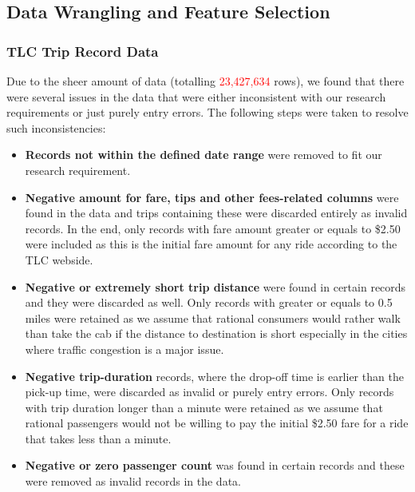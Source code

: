 \documentclass[11pt]{article}
\begin{document}
\subsection{Data Wrangling and Feature Selection}

\subsubsection{TLC Trip Record Data}
Due to the sheer amount of data (totalling \textcolor{red}{23,427,634} rows), we found that there were several issues in the data that were either inconsistent with our research requirements or just purely entry errors. The following steps were taken to resolve such inconsistencies:
\begin{itemize}
\item \textbf{Records not within the defined date range} were removed to fit our research requirement.\vspace{-1mm}

\item \textbf{Negative amount for fare, tips and other fees-related columns} were found in the data and trips containing these were discarded entirely as invalid records. In the end, only records with fare amount greater or equals to \$2.50 were included as this is the initial fare amount for any ride according to the TLC webside.
\vspace{-1mm}

\item \textbf{Negative or extremely short trip distance} were found in certain records and they were discarded as well. Only records with greater or equals to 0.5 miles were retained as we assume that rational consumers would rather walk than take the cab if the distance to destination is short especially in the cities where traffic congestion is a major issue.
\vspace{-1mm}

\item \textbf{Negative trip-duration} records, where the drop-off time is earlier than the pick-up time, were discarded as invalid or purely entry errors. Only records with trip duration longer than a minute were retained as we assume that rational passengers would not be willing to pay the initial \$2.50 fare for a ride that takes less than a minute.
\vspace{-1mm}

\item \textbf{Negative or zero passenger count} was found in certain records and these were removed as invalid records in the data. 
\vspace{-1mm}


\end{itemize}
\end{document}
